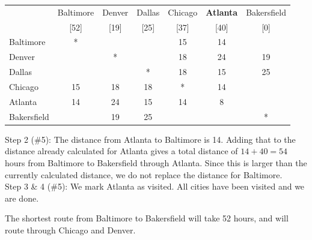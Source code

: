 \begin{example}{}{}
 \begin{center}
 \begin{tabular}{|l|c|c|c|c|c|c|}
 \hline
 & Baltimore & \cellcolor{yellow}Denver &  \cellcolor{yellow}Dallas &  \cellcolor{yellow}Chicago & \textbf{Atlanta} & \cellcolor{yellow}Bakersfield\\
 &[52]& \cellcolor{yellow}[19]& \cellcolor{yellow}[25]& \cellcolor{yellow}[37]&[40]&\cellcolor{yellow}[0]\\
 \hline
 Baltimore & * & \cellcolor{yellow}& \cellcolor{yellow}& \cellcolor{yellow}15&14&\cellcolor{yellow}\\
 \hline
 \cellcolor{yellow} Denver & \cellcolor{yellow}& \cellcolor{yellow}*& \cellcolor{yellow}& \cellcolor{yellow}18& \cellcolor{yellow}24&\cellcolor{yellow}19\\
 \hline
 \cellcolor{yellow}Dallas& \cellcolor{yellow}& \cellcolor{yellow}& \cellcolor{yellow}*& \cellcolor{yellow}18& \cellcolor{yellow}15&\cellcolor{yellow}25\\
 \hline
  \cellcolor{yellow}Chicago & \cellcolor{yellow}15& \cellcolor{yellow}18& \cellcolor{yellow}18& \cellcolor{yellow}*& \cellcolor{yellow}14&\cellcolor{yellow}\\
 \hline
 Atlanta & 14 &  \cellcolor{yellow}24& \cellcolor{yellow}15& \cellcolor{yellow}14&8&\cellcolor{yellow}\\
 \hline
 \cellcolor{yellow}Bakersfield &\cellcolor{yellow}&\cellcolor{yellow}19&\cellcolor{yellow}25&\cellcolor{yellow}&\cellcolor{yellow}&\cellcolor{yellow}*\\
 \hline
 \end{tabular}
 \end{center}


\noindent Step 2 (\#5):  The distance from Atlanta to Baltimore is 14.  Adding that to the distance already calculated for Atlanta gives a total distance of $14+40 = 54$ hours from Baltimore to Bakersfield through Atlanta.  Since this is larger than the currently calculated distance, we do not replace the distance for Baltimore.\\

\noindent Step 3 \& 4 (\#5):  We mark Atlanta as visited.  All cities have been visited and we are done.  

The shortest route from Baltimore to Bakersfield will take 52 hours, and will route through Chicago and Denver.
\end{example}

